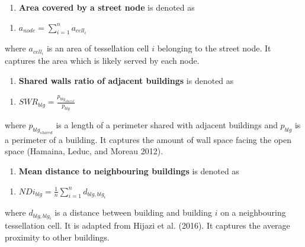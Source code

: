 \documentclass[
  letterpaper,
  DIV=11,
  numbers=noendperiod]{scrartcl}
\providecommand{\tightlist}{%
  \setlength{\itemsep}{0pt}\setlength{\parskip}{0pt}}\usepackage{longtable,booktabs,array}
\begin{document}
\begin{enumerate}
\def\labelenumi{\arabic{enumi}.}
\setcounter{enumi}{23}
\tightlist
\item
  \textbf{Area covered by a street node} is denoted as
\end{enumerate}

\begin{enumerate}
\def\labelenumi{(\arabic{enumi})}
\setcounter{enumi}{23}
\tightlist
\item
  \(a_{node} = \sum_{i=1}^{n} a_{cell_i}\)
\end{enumerate}

where \(a_{cell_i}\) is an area of tessellation cell \(i\) belonging to
the street node. It captures the area which is likely served by each
node.

\begin{enumerate}
\def\labelenumi{\arabic{enumi}.}
\setcounter{enumi}{24}
\tightlist
\item
  \textbf{Shared walls ratio of adjacent buildings} is denoted as
\end{enumerate}

\begin{enumerate}
\def\labelenumi{(\arabic{enumi})}
\setcounter{enumi}{24}
\tightlist
\item
  \(SWR_{blg} = \frac{p_{blg_{shared}}}{p_{blg}}\)
\end{enumerate}

where \(p_{blg_{shared}}\) is a length of a perimeter shared with
adjacent buildings and \(p_{blg}\) is a perimeter of a building. It
captures the amount of wall space facing the open space (Hamaina, Leduc,
and Moreau 2012).

\begin{enumerate}
\def\labelenumi{\arabic{enumi}.}
\setcounter{enumi}{25}
\tightlist
\item
  \textbf{‌Mean distance to neighbouring buildings} is denoted as
\end{enumerate}

\begin{enumerate}
\def\labelenumi{(\arabic{enumi})}
\setcounter{enumi}{25}
\tightlist
\item
  \(NDi_{blg} = \frac{1}{n} \sum_{i=1}^{n} d_{blg, blg_i}\)
\end{enumerate}

where \(d_{blg, blg_i}\) is a distance between building and building
\(i\) on a neighbouring tessellation cell. It is adapted from Hijazi et
al. (2016). It captures the average proximity to other buildings.
\end{document}
